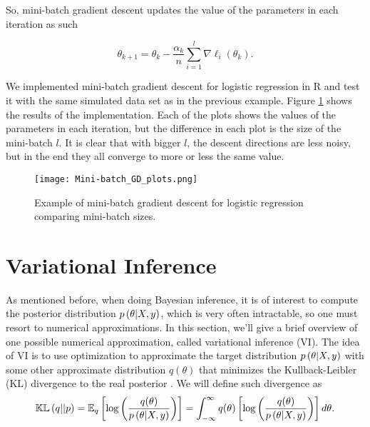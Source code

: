 So, mini-batch gradient descent updates the value of the parameters in each iteration as such


$$
  \theta_{k+1} = \theta_k - \frac{\alpha_k}{n} \sum_{i = 1}^l \nabla \ell_i(\theta_k).
$$


We implemented mini-batch gradient descent for logistic regression in R and test it with the same simulated data set as in the previous example. Figure \ref{fig:Mini-batch_GD_plots} shows the results of the implementation. Each of the plots shows the values of the parameters in each iteration, but the difference in each plot is the size of the mini-batch $l$. It is clear that with bigger $l$, the descent directions are less noisy, but in the end they all converge to more or less the same value.

\begin{figure}[H]
    \centering
    \texttt{[image: Mini-batch\_GD\_plots.png]}
    \caption{Example of mini-batch gradient descent for logistic regression comparing mini-batch sizes.}
    \label{fig:Mini-batch_GD_plots}
\end{figure}


\section{Variational Inference}

As mentioned before, when doing Bayesian inference, it is of interest to compute the posterior distribution $p\left( \theta | X, y \right)$, which is very often intractable, so one must resort to numerical approximations. In this section, we'll give a brief overview of one possible numerical approximation, called variational inference (VI). The idea of VI is to use optimization to approximate the target distribution $p\left( \theta | X, y \right)$ with some other approximate distribution $q(\theta)$ that minimizes the Kullback-Leibler (KL) divergence to the real posterior \cite{blei2017variational}. We will define such divergence as
\begin{equation}
  \label{eq:kl_divergence}
  \mathbb{KL}\left( q || p \right) = \mathbb{E}_q \left[ \log \left( \frac{q(\theta)}{p\left( \theta | X, y \right)} \right) \right] = \int_{-\infty}^{\infty} q(\theta) \left[ \log \left( \frac{q(\theta)}{p\left( \theta | X, y \right)} \right) \right] d\theta.
\end{equation}

